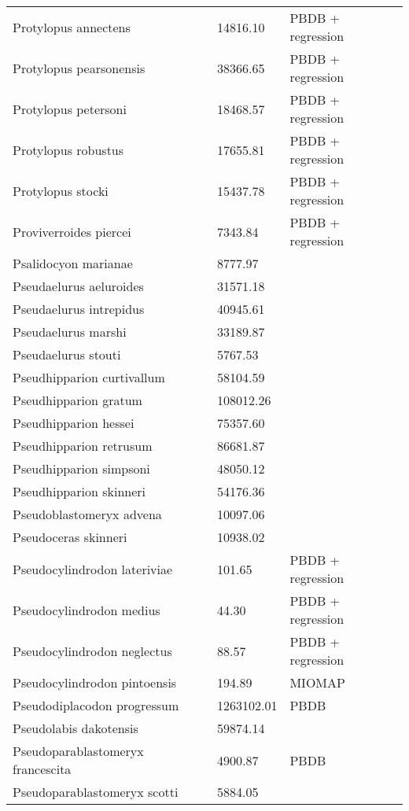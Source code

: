 \documentclass{article}
\begin{document}
\begin{center}
\begin{longtable}{p{} p{} p{} }
  Protylopus annectens & 14816.10 & PBDB + regression \\ 
  Protylopus pearsonensis & 38366.65 & PBDB + regression \\ 
  Protylopus petersoni & 18468.57 & PBDB + regression \\ 
  Protylopus robustus & 17655.81 & PBDB + regression \\ 
  Protylopus stocki & 15437.78 & PBDB + regression \\ 
  Proviverroides piercei & 7343.84 & PBDB + regression \\ 
  Psalidocyon marianae & 8777.97 & \cite{Tomiya2013} \\ 
  Pseudaelurus aeluroides & 31571.18 & \cite{Tomiya2013} \\ 
  Pseudaelurus intrepidus & 40945.61 & \cite{Tomiya2013} \\ 
  Pseudaelurus marshi & 33189.87 & \cite{Tomiya2013} \\ 
  Pseudaelurus stouti & 5767.53 & \cite{Tomiya2013} \\ 
  Pseudhipparion curtivallum & 58104.59 & \cite{Tomiya2013} \\ 
  Pseudhipparion gratum & 108012.26 & \cite{Tomiya2013} \\ 
  Pseudhipparion hessei & 75357.60 & \cite{Tomiya2013} \\ 
  Pseudhipparion retrusum & 86681.87 & \cite{Tomiya2013} \\ 
  Pseudhipparion simpsoni & 48050.12 & \cite{Tomiya2013} \\ 
  Pseudhipparion skinneri & 54176.36 & \cite{Tomiya2013} \\ 
  Pseudoblastomeryx advena & 10097.06 & \cite{Tomiya2013} \\ 
  Pseudoceras skinneri & 10938.02 & \cite{Tomiya2013} \\ 
  Pseudocylindrodon lateriviae & 101.65 & PBDB + regression \\ 
  Pseudocylindrodon medius & 44.30 & PBDB + regression \\ 
  Pseudocylindrodon neglectus & 88.57 & PBDB + regression \\ 
  Pseudocylindrodon pintoensis & 194.89 & MIOMAP \\ 
  Pseudodiplacodon progressum & 1263102.01 & PBDB \\ 
  Pseudolabis dakotensis & 59874.14 & \cite{Tomiya2013} \\ 
  Pseudoparablastomeryx francescita & 4900.87 & PBDB \\ 
  Pseudoparablastomeryx scotti & 5884.05 & \cite{Tomiya2013} \\ 

\end{longtable}
\end{center}
\end{document}
